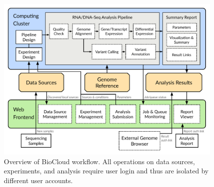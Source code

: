 \begin{figure}[!tb]
\centering
\includegraphics[width=1\textwidth]{images/overview_workflow}
\caption[Overview of BioCloud website workflow]{
    Overview of BioCloud workflow. All operations on data sources, experiments,
    and analysis require user login and thus are isolated by different user
    accounts.
}
\label{fig:overview-workflow}
\end{figure}
